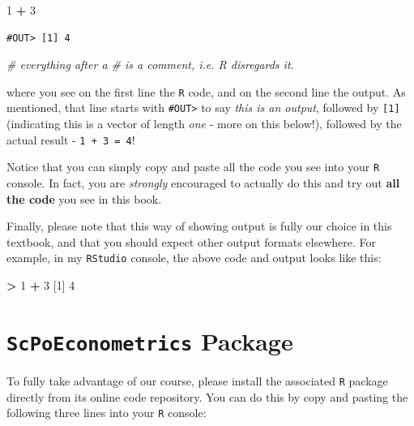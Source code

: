 \documentclass[]{book}
\newenvironment{Shaded}{\begin{snugshade}}{\end{snugshade}}
\newcommand{\DecValTok}[1]{\textcolor[rgb]{0.00,0.00,0.81}{#1}}
\newcommand{\StringTok}[1]{\textcolor[rgb]{0.31,0.60,0.02}{#1}}
\newcommand{\CommentTok}[1]{\textcolor[rgb]{0.56,0.35,0.01}{\textit{#1}}}
\newcommand{\OperatorTok}[1]{\textcolor[rgb]{0.81,0.36,0.00}{\textbf{#1}}}
\newcommand{\NormalTok}[1]{#1}
\theoremstyle{definition}
\theoremstyle{definition}
\theoremstyle{definition}
\theoremstyle{remark}
\begin{document}
\begin{Shaded}
\begin{Highlighting}[]
\DecValTok{1} \OperatorTok{+}\StringTok{ }\DecValTok{3}
\end{Highlighting}
\end{Shaded}

\begin{verbatim}
#OUT> [1] 4
\end{verbatim}

\begin{Shaded}
\begin{Highlighting}[]
\CommentTok{# everything after a # is a comment, i.e. R disregards it.}
\end{Highlighting}
\end{Shaded}

where you see on the first line the \texttt{R} code, and on the second
line the output. As mentioned, that line starts with
\texttt{\#OUT\textgreater{}} to say \emph{this is an output}, followed
by \texttt{{[}1{]}} (indicating this is a vector of length \emph{one} -
more on this below!), followed by the actual result -
\texttt{1\ +\ 3\ =\ 4}!

Notice that you can simply copy and paste all the code you see into your
\texttt{R} console. In fact, you are \emph{strongly} encouraged to
actually do this and try out \textbf{all the code} you see in this book.

Finally, please note that this way of showing output is fully our choice
in this textbook, and that you should expect other output formats
elsewhere. For example, in my \texttt{RStudio} console, the above code
and output looks like this:

\begin{Shaded}
\begin{Highlighting}[]
\OperatorTok{>}\StringTok{ }\DecValTok{1} \OperatorTok{+}\StringTok{ }\DecValTok{3}
\NormalTok{[}\DecValTok{1}\NormalTok{] }\DecValTok{4}
\end{Highlighting}
\end{Shaded}

\section{\texorpdfstring{\texttt{ScPoEconometrics}
Package}{ScPoEconometrics Package}}\label{install-package}

To fully take advantage of our course, please install the associated
\texttt{R} package directly from its online code repository. You can do
this by copy and pasting the following three lines into your \texttt{R}
console:
\end{document}
